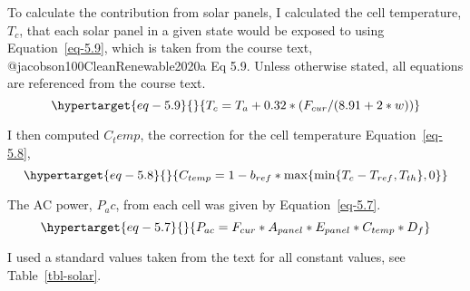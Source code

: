 \documentclass{scrartcl}
\begin{document}
To calculate the contribution from solar panels, I calculated the cell
temperature, \(T_c\), that each solar panel in a given state would be
exposed to using Equation~\ref{eq-5.9}, which is taken from the course
text, @jacobson100CleanRenewable2020a Eq 5.9. Unless otherwise stated,
all equations are referenced from the course text.
\begin{equation}\protect\hypertarget{eq-5.9}{}{ 
T_c = T_a + 0.32 * (F_{cur}/(8.91 + 2*w))
}\label{eq-5.9}\end{equation}

I then computed \(C_temp\), the correction for the cell temperature
Equation~\ref{eq-5.8}, \begin{equation}\protect\hypertarget{eq-5.8}{}{ 
C_{temp} = 1 - b_{ref} * \max\{ \min \{T_c - T_{ref}, T_{th} \}, 0 \} 
}\label{eq-5.8}\end{equation}

The AC power, \(P_ac\), from each cell was given by
Equation~\ref{eq-5.7}.\\
\begin{equation}\protect\hypertarget{eq-5.7}{}{ 
 P_{ac} = F_{cur} * A_{panel} * E_{panel} * C_{temp} * D_f
}\label{eq-5.7}\end{equation}

I used a standard values taken from the text for all constant values,
see Table~\ref{tbl-solar}.
\end{document}
